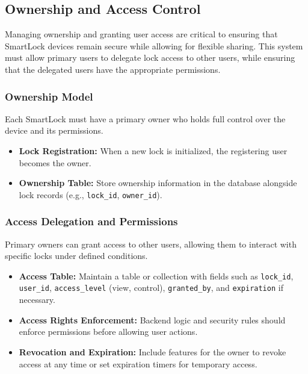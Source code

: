 \subsection{Ownership and Access Control}

Managing ownership and granting user access are critical to ensuring that SmartLock devices remain secure while allowing for flexible sharing. This system must allow primary users to delegate lock access to other users, while ensuring that the delegated users have the appropriate permissions.

\subsubsection{Ownership Model}

Each SmartLock must have a primary owner who holds full control over the device and its permissions.

\begin{itemize}
  \item \textbf{Lock Registration:} When a new lock is initialized, the registering user becomes the owner.
  \item \textbf{Ownership Table:} Store ownership information in the database alongside lock records (e.g., \texttt{lock\_id}, \texttt{owner\_id}).
\end{itemize}

\subsubsection{Access Delegation and Permissions}

Primary owners can grant access to other users, allowing them to interact with specific locks under defined conditions.

\begin{itemize}
  \item \textbf{Access Table:} Maintain a table or collection with fields such as \texttt{lock\_id}, \texttt{user\_id}, \texttt{access\_level} (view, control), \texttt{granted\_by}, and \texttt{expiration} if necessary.
  \item \textbf{Access Rights Enforcement:} Backend logic and security rules should enforce permissions before allowing user actions.
  \item \textbf{Revocation and Expiration:} Include features for the owner to revoke access at any time or set expiration timers for temporary access.
\end{itemize}

